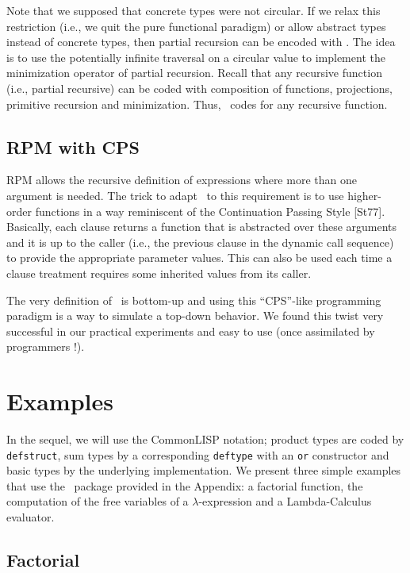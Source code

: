 \begin{sloppypar}
Note that we supposed that concrete types were not circular. If we
relax this restriction (i.e., we quit the pure functional paradigm) or
allow abstract types instead of concrete types,
then partial recursion can be encoded with \rpm. The idea is to use
the potentially infinite traversal on a circular value to implement
the minimization operator of partial recursion. Recall that any
recursive function (i.e., partial recursive) can be coded with
composition of functions, projections, primitive recursion and
minimization. Thus, \rpm\ codes for any recursive function.

\subsection{RPM with CPS}

RPM allows the recursive definition of expressions where more than one
argument is needed. The trick to adapt \rpm\ to this requirement is to
use higher-order functions in a way reminiscent of the Continuation
Passing Style [St77]. Basically, each clause returns a function that is
abstracted over these arguments and it is up to the caller (i.e., the
previous clause in the dynamic call sequence) to provide the
appropriate parameter values.  This can also be used each time a clause
treatment requires some inherited values from its caller.

The very definition of \rpm\ is bottom-up and using this ``CPS''-like
programming paradigm is a way to simulate a top-down behavior. We
found this twist very successful in our practical experiments and easy
to use (once assimilated by programmers !).

\section{Examples}

In the sequel, we will use the CommonLISP notation; product types are
coded by {\tt defstruct}, sum types by a corresponding {\tt deftype}
with an {\tt or} constructor and basic types by the underlying implementation.
We present three simple examples that use the \rpm\ package provided in
the Appendix: a factorial function, the computation of the free
variables of a $\lambda$-expression and a Lambda-Calculus evaluator.

\subsection{Factorial}


\end{sloppypar}
